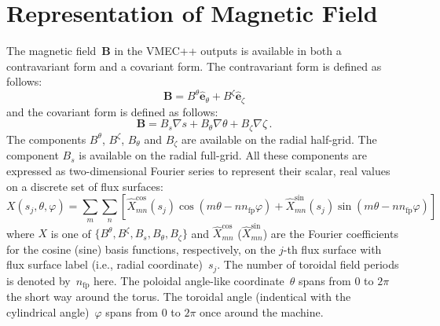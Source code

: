 \section{Representation of Magnetic Field}
The magnetic field~$\mathbf{B}$ in the VMEC++ outputs
is available in both a contravariant form
and a covariant form.
The contravariant form is defined as follows:
\begin{equation}
 \mathbf{B} = B^\theta \hat{\mathbf{e}}_\theta + B^\zeta \hat{\mathbf{e}}_\zeta
\end{equation}
and the covariant form is defined as follows:
\begin{equation}
 \mathbf{B} = B_s \nabla s + B_\theta \nabla \theta + B_\zeta \nabla \zeta \, .
\end{equation}
The components $B^\theta$, $B^\zeta$, $B_\theta$ and $B_\zeta$
are available on the radial half-grid.
The component $B_s$ is available on the radial full-grid.
%
All these components are expressed as two-dimensional Fourier series
to represent their scalar, real values on a discrete set of flux surfaces:
\begin{equation}
 X(s_j, \theta, \varphi) =
 \sum\limits_{m} \sum\limits_{n}
   \left[   \hat{X}_{mn}^\textrm{cos}(s_j) \cos(m \theta - n n_\textrm{fp} \varphi)
          + \hat{X}_{mn}^\textrm{sin}(s_j) \sin(m \theta - n n_\textrm{fp} \varphi) \right]
\end{equation}
where $X$ is one of $\{B^\theta, B^\zeta, B_s, B_\theta, B_\zeta\}$
and $\hat{X}_{mn}^\textrm{cos}$ ($\hat{X}_{mn}^\textrm{sin}$)
are the Fourier coefficients for the cosine (sine) basis functions, respectively,
on the $j$-th flux surface with flux surface label (i.e., radial coordinate)~$s_j$.
The number of toroidal field periods is denoted by~$n_\textrm{fp}$ here.
The poloidal angle-like coordinate~$\theta$ spans from $0$ to $2 \pi$
the short way around the torus.
The toroidal angle (indentical with the cylindrical angle)~$\varphi$
spans from $0$ to $2 \pi$ once around the machine.

